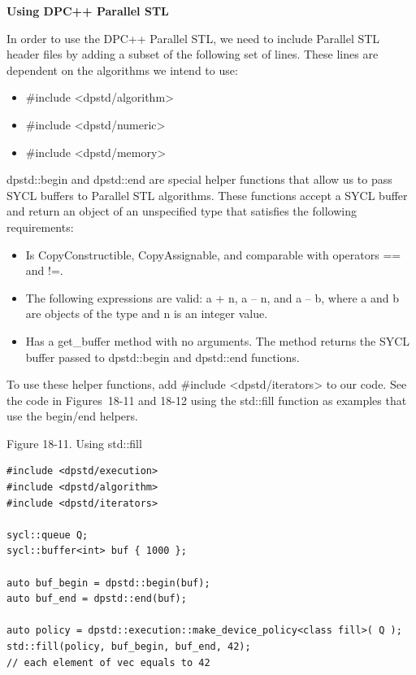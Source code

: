 \hspace*{\fill} \par %
\textbf{Using DPC++ Parallel STL}

In order to use the DPC++ Parallel STL, we need to include Parallel STL header files by adding a subset of the following set of lines. These lines are dependent on the algorithms we intend to use:\par

\begin{itemize}
	\item \#include <dpstd/algorithm>
	\item \#include <dpstd/numeric>
	\item \#include <dpstd/memory>
\end{itemize}

dpstd::begin and dpstd::end are special helper functions that allow us to pass SYCL buffers to Parallel STL algorithms. These functions accept a SYCL buffer and return an object of an unspecified type that satisfies the following requirements:\par

\begin{itemize}
	\item Is CopyConstructible, CopyAssignable, and 	comparable with operators == and !=.
	\item The following expressions are valid: a + n, a – n, and a – b, where a and b are objects of the type and n is an integer value.
	\item Has a get\_buffer method with no arguments. The method returns the SYCL buffer passed to dpstd::begin and dpstd::end functions.
\end{itemize}

To use these helper functions, add \#include <dpstd/iterators> to our code. See the code in Figures 18-11 and 18-12 using the std::fill function as examples that use the begin/end helpers.\par

\hspace*{\fill} \par %
Figure 18-11. Using std::fill
\begin{lstlisting}[caption={}]
#include <dpstd/execution>
#include <dpstd/algorithm>
#include <dpstd/iterators>

sycl::queue Q;
sycl::buffer<int> buf { 1000 };

auto buf_begin = dpstd::begin(buf);
auto buf_end = dpstd::end(buf);

auto policy = dpstd::execution::make_device_policy<class fill>( Q );
std::fill(policy, buf_begin, buf_end, 42);
// each element of vec equals to 42
\end{lstlisting}

